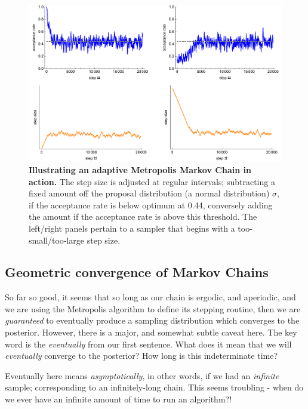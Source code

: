 \documentclass[11pt,fullpage]{book}
\begin{document}
\begin{figure}
\centerline{\includegraphics[width=1\textwidth]{metropolisHastings_acceptanceRate.pdf}}
\caption{\textbf{Illustrating an adaptive Metropolis Markov Chain in action.} The step size is adjusted at regular intervals; subtracting a fixed amount off the proposal distribution (a normal distribution) $\sigma$, if the acceptance rate is below optimum at 0.44, conversely adding the amount if the acceptance rate is above this threshold. The left/right panels pertain to a sampler that begins with a too-small/too-large step size.}\label{fig:metropolisHastings_acceptanceRate}
\end{figure}

\subsection{Geometric convergence of Markov Chains}\label{sec:metropolisHastings_geometricConvergenceMarkovChain}
So far so good, it seems that so long as our chain is ergodic, and aperiodic, and we are using the Metropolis algorithm to define its stepping routine, then we are \textit{guaranteed} to eventually produce a sampling distribution which converges to the posterior. However, there is a major, and somewhat subtle caveat here. The key word is the \textit{eventually} from our first sentence. What does it mean that we will \textit{eventually} converge to the posterior? How long is this indeterminate time?

Eventually here means \textit{asymptotically}, in other words, if we had an \textit{infinite} sample; corresponding to an infinitely-long chain. This seems troubling - when do we ever have an infinite amount of time to run an algorithm?!
\end{document}

